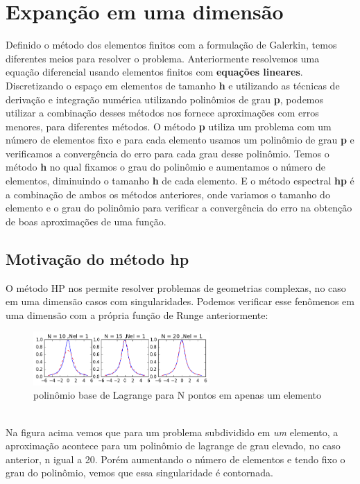 \chapter{Expanção em uma dimensão}
 Definido o método dos elementos finitos com a formulação de Galerkin, temos diferentes meios para resolver o problema. Anteriormente resolvemos uma equação diferencial usando elementos finitos com \textbf{equações lineares}. Discretizando o espaço em elementos de tamanho \textbf{h} e utilizando as técnicas de derivação e integração numérica utilizando polinômios de grau \textbf{p}, podemos utilizar a combinação desses métodos nos fornece aproximações com erros menores, para diferentes métodos.
 O método \textbf{p} utiliza um problema com um número de elementos fixo e para cada elemento usamos um  polinômio de grau \textbf{p} e verificamos a convergência do erro para cada grau desse polinômio. Temos o método \textbf{h} no qual fixamos o grau do polinômio e aumentamos o número de elementos, diminuindo o tamanho \textbf{h} de cada elemento.
 E o método espectral \textbf{hp} é a combinação de ambos os métodos anteriores, onde variamos o tamanho do elemento e o grau do polinômio para verificar a convergência do erro na obtenção de boas aproximações de uma função. 
 \section{Motivação do método hp}
 O método HP nos permite resolver problemas de geometrias complexas, no caso em uma dimensão casos com singularidades. Podemos verificar esse fenômenos em uma dimensão com a própria função de Runge anteriormente:
\begin{figure}[!h]
\includegraphics[width=0.6\textwidth, center ]{figuras/compara_metodo_n.png}
\caption{polinômio base de Lagrange para N  pontos em apenas um elemento}
\end{figure}
\\ Na figura acima vemos que para um problema subdividido em \emph{um} elemento, a aproximação acontece para um polinômio de lagrange de grau elevado, no caso anterior, n igual a 20. Porém  aumentando o número de elementos e tendo fixo o grau do polinômio, vemos que essa singularidade é contornada.

